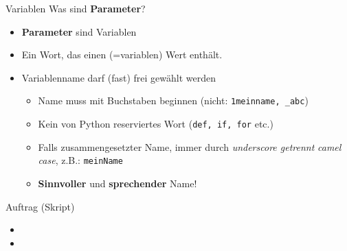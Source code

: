 \begin{frame}[fragile]{Variablen}
	Was sind \textbf{Parameter}?
	\begin{itemize}[<+->]
		\item \textbf{Parameter} sind Variablen
		\item Ein Wort, das einen  (=variablen) Wert enthält.
		\item Variablenname darf (fast) frei gewählt werden
		      \begin{itemize}
			      \item Name muss mit Buchstaben beginnen (nicht: \verb|1meinname, _abc|)
			      \item Kein von Python reserviertes Wort (\lstinline|def, if, for| etc.)
			      \item Falls zusammengesetzter Name, immer durch \textit{underscore getrennt } \textit{camel case}, z.B.: \lstinline|meinName|
			      \item \textbf{Sinnvoller} und \textbf{sprechender} Name!
		      \end{itemize}
	\end{itemize}
\end{frame}


\begin{frame}[fragile]{Auftrag (Skript)}
	\begin{itemize}
		\item {}
		\item {}
	\end{itemize}

\end{frame}
